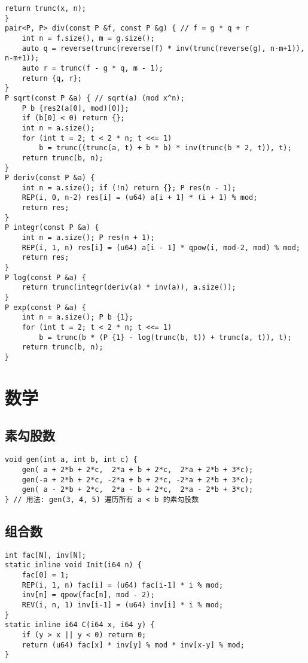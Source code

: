\documentclass[a4paper,landscape,twocolumn]{ctexart}
\begin{document}
\begin{lstlisting}[basicstyle=\footnotesize\ttfamily]
	return trunc(x, n);
}
pair<P, P> div(const P &f, const P &g) { // f = g * q + r
	int n = f.size(), m = g.size();
	auto q = reverse(trunc(reverse(f) * inv(trunc(reverse(g), n-m+1)), n-m+1));
	auto r = trunc(f - g * q, m - 1);
	return {q, r};
}
P sqrt(const P &a) { // sqrt(a) (mod x^n);
	P b {res2(a[0], mod)[0]};
	if (b[0] < 0) return {};
	int n = a.size();
	for (int t = 2; t < 2 * n; t <<= 1)
		b = trunc((trunc(a, t) + b * b) * inv(trunc(b * 2, t)), t);
	return trunc(b, n);
}
P deriv(const P &a) {
	int n = a.size(); if (!n) return {}; P res(n - 1);
	REP(i, 0, n-2) res[i] = (u64) a[i + 1] * (i + 1) % mod;
	return res;
}
P integr(const P &a) {
	int n = a.size(); P res(n + 1);
	REP(i, 1, n) res[i] = (u64) a[i - 1] * qpow(i, mod-2, mod) % mod;
	return res;
}
P log(const P &a) {
	return trunc(integr(deriv(a) * inv(a)), a.size());
}
P exp(const P &a) {
	int n = a.size(); P b {1};
	for (int t = 2; t < 2 * n; t <<= 1)
		b = trunc(b * (P {1} - log(trunc(b, t)) + trunc(a, t)), t);
	return trunc(b, n);
}
\end{lstlisting}

\section{数学}

\subsection{素勾股数}

\begin{lstlisting}
void gen(int a, int b, int c) {
    gen( a + 2*b + 2*c,  2*a + b + 2*c,  2*a + 2*b + 3*c);
    gen(-a + 2*b + 2*c, -2*a + b + 2*c, -2*a + 2*b + 3*c);
    gen( a - 2*b + 2*c,  2*a - b + 2*c,  2*a - 2*b + 3*c);
} // 用法: gen(3, 4, 5) 遍历所有 a < b 的素勾股数
\end{lstlisting}

\subsection{组合数}

\begin{lstlisting}
int fac[N], inv[N];
static inline void Init(i64 n) {
	fac[0] = 1;
	REP(i, 1, n) fac[i] = (u64) fac[i-1] * i % mod;
	inv[n] = qpow(fac[n], mod - 2);
	REV(i, n, 1) inv[i-1] = (u64) inv[i] * i % mod;
}
static inline i64 C(i64 x, i64 y) {
	if (y > x || y < 0) return 0;
	return (u64) fac[x] * inv[y] % mod * inv[x-y] % mod;
}
\end{lstlisting}
\end{document}
